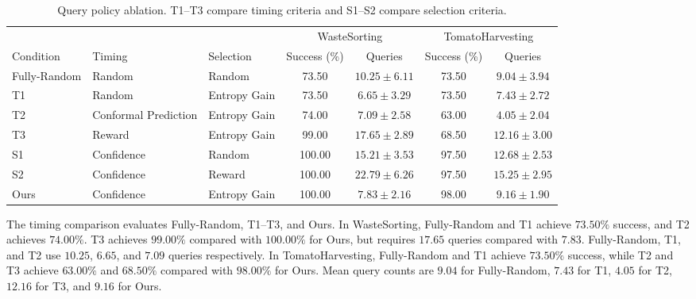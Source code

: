 \begin{table}[t]
\centering
\caption{Query policy ablation. T1--T3 compare timing criteria and S1--S2 compare selection criteria.}
\label{tab:policy_ablation}
\label{tab:when_what_random}
\small
\setlength{\tabcolsep}{4pt}
\begin{tabular}{lllcccc}
\toprule
 & & & \multicolumn{2}{c}{WasteSorting} & \multicolumn{2}{c}{TomatoHarvesting} \\
\cmidrule(lr){4-5}\cmidrule(lr){6-7}
Condition & Timing & Selection & Success (\%) & Queries & Success (\%) & Queries \\
\midrule
Fully-Random & Random & Random & 73.50 & $10.25 \pm 6.11$ & 73.50 & $9.04 \pm 3.94$ \\
T1 & Random & Entropy Gain & 73.50 & $6.65 \pm 3.29$ & 73.50 & $7.43 \pm 2.72$ \\
T2 & Conformal Prediction & Entropy Gain & 74.00 & $7.09 \pm 2.58$ & 63.00 & $4.05 \pm 2.04$ \\
T3 & Reward & Entropy Gain & 99.00 & $17.65 \pm 2.89$ & 68.50 & $12.16 \pm 3.00$ \\
S1 & Confidence & Random & 100.00 & $15.21 \pm 3.53$ & 97.50 & $12.68 \pm 2.53$ \\
S2 & Confidence & Reward & 100.00 & $22.79 \pm 6.26$ & 97.50 & $15.25 \pm 2.95$ \\
Ours & Confidence & Entropy Gain & 100.00 & $7.83 \pm 2.16$ & 98.00 & $9.16 \pm 1.90$ \\
\bottomrule
\end{tabular}
\end{table}

The timing comparison evaluates Fully-Random, T1--T3, and Ours. In WasteSorting, Fully-Random and T1 achieve $73.50\%$ success, and T2 achieves $74.00\%$. T3 achieves $99.00\%$ compared with $100.00\%$ for Ours, but requires $17.65$ queries compared with $7.83$. Fully-Random, T1, and T2 use $10.25$, $6.65$, and $7.09$ queries respectively. In TomatoHarvesting, Fully-Random and T1 achieve $73.50\%$ success, while T2 and T3 achieve $63.00\%$ and $68.50\%$ compared with $98.00\%$ for Ours. Mean query counts are $9.04$ for Fully-Random, $7.43$ for T1, $4.05$ for T2, $12.16$ for T3, and $9.16$ for Ours.

